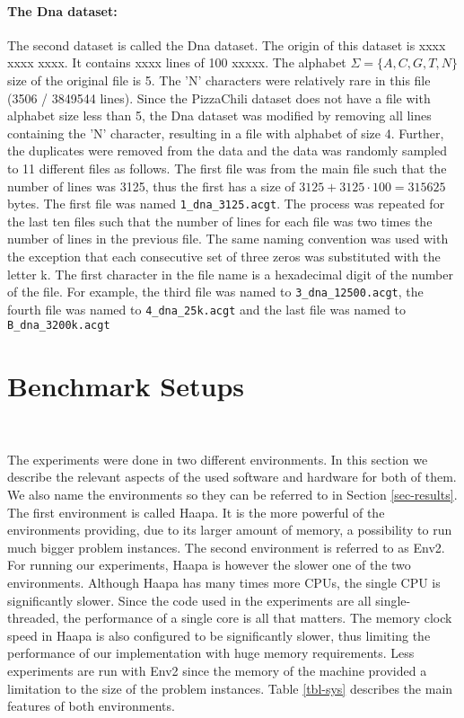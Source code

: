 \documentclass[english,twoside,censored,csm,algorithms-track-2020]{HYthesisML}
\theoremstyle{plain}
\theoremstyle{definition}
\begin{document}
\paragraph{The Dna dataset:}
The second dataset is called the Dna dataset. The origin of this dataset is xxxx xxxx xxxx.
It contains xxxx lines of 100 xxxxx. The alphabet $\Sigma=\{A,C,G,T,N\}$ size of the original file is 5.
The 'N' characters were relatively rare in this file (3506 / 3849544 lines).
Since the PizzaChili dataset does not have a
file with alphabet size less than 5, the Dna dataset was modified by removing all lines containing
the 'N' character, resulting in a file with alphabet of size 4.
Further, the duplicates were removed from the data and the data was randomly sampled to 11 different
files as follows. The first file was from the main file such that the number of lines was 3125, thus
the first has a size of $3125+3125\cdot 100 = 315625$ bytes. The first file was named
\texttt{1\_dna\_3125.acgt}. The process was repeated for the last ten files such that the number
of lines for each file was two times the number of lines in the previous file.
The same naming convention
was used with the exception that each consecutive set of three zeros was substituted with the letter k.
The first character in the file name is a hexadecimal digit of the number of the file.
For example, the third file was named to \texttt{3\_dna\_12500.acgt}, the fourth file was named
to \texttt{4\_dna\_25k.acgt} and the last file was named to \texttt{B\_dna\_3200k.acgt}

\section{Benchmark Setups}~\label{sec-env}

The experiments were done in two different environments. In this section we describe the relevant
aspects of the used software and hardware for both of them. We also name the environments so they
can be referred to in Section \ref{sec-results}. The first environment is called Haapa. It is the more
powerful of the environments providing, due to its larger amount of memory, a possibility to run
much bigger problem instances. The second
environment is referred to as Env2. For running
our experiments, Haapa is however the slower one of the two environments. Although Haapa has many times
more CPUs, the single CPU is significantly slower. Since the code used in the experiments
are all single-threaded, the performance of a single core is all that matters. The memory
clock speed in Haapa is also configured to be significantly slower, thus limiting the performance
of our implementation with huge memory requirements. Less experiments are run with Env2 since the
memory of the machine provided a limitation to the size of the problem instances.
Table \ref{tbl-sys} describes the main features of both environments.
\end{document}
